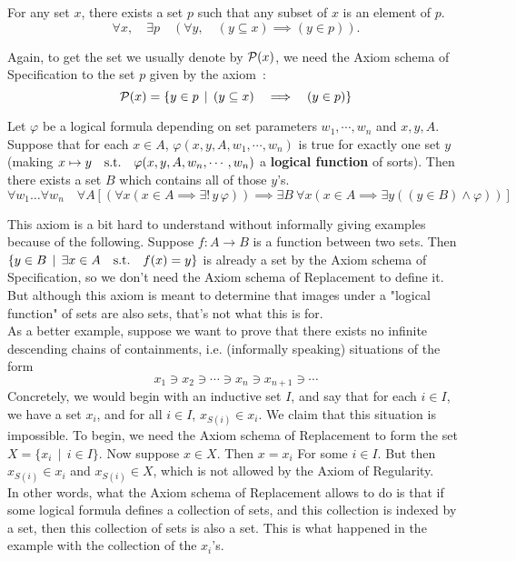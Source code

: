 \begin{axiom}
    For any set $x$, there exists a set $p$ such that any subset of $x$ is an element of $p$.
    \[
        \forall x, \quad \exists p \quad (\forall y, \quad (y \subseteq x) \implies (y \in p)).    
    \]
\end{axiom}

\begin{remark}
    Again, to get the set we usually denote by $\operatorname{\mathcal P}(x)$, we need the Axiom schema of Specification to the set $p$ given by the axiom~:
    \[
        \operatorname{\mathcal P}(x) = \{ y \in p \, \mid \, (y \subseteq x) \quad \Longrightarrow \quad (y \in p) \}    
    \]
\end{remark}

\begin{axiom}
    Let $\varphi$ be a logical formula depending on set parameters $w_1,\cdots,w_n$ and $x,y,A$. Suppose that for each $x \in A$, $\varphi(x,y,A,w_1,\cdots,w_n)$ is true for exactly one set $y$ (making $x \mapsto y \quad \text{s.t.} \quad \varphi(x,y,A,w_n,\cdots,w_n)$ a \textbf{logical function} of sorts). Then there exists a set $B$ which contains all of those $y$'s. 
    \[
        \forall w_1 \ldots \forall w_n \quad \forall A \left[ (\forall x( x \in A \implies \exists ! \, y \, \varphi)) \implies \exists B\ \forall x \left( x \in A \implies \exists y( (y \in B) \land \varphi )  \right) \right]
    \]
\end{axiom}

\begin{remark}
    This axiom is a bit hard to understand without informally giving examples because of the following. Suppose $f : A \to B$ is a function between two sets. Then $\{ y \in B \, \mid \, \exists x \in A \quad \text{s.t.} \quad f(x) = y \}$ is already a set by the Axiom schema of Specification, so we don't need the Axiom schema of Replacement to define it. But although this axiom is meant to determine that images under a "logical function" of sets are also sets, that's not what this is for. 
    \\

    As a better example, suppose we want to prove that there exists no infinite descending chains of containments, i.e. (informally speaking) situations of the form
    \[
        x_1 \ni x_2 \ni \cdots \ni x_n \ni x_{n+1} \ni \cdots    
    \]
    Concretely, we would begin with an inductive set $I$, and say that for each $i \in I$, we have a set $x_i$, and for all $i \in I$, $x_{S(i)} \in x_i$. We claim that this situation is impossible. To begin, we need the Axiom schema of Replacement to form the set $X = \{ x_i \, \mid \, i \in I \}$. Now suppose $x \in X$. Then $x = x_i$ For some $i \in I$. But then $x_{S(i)} \in x_i$ and $x_{S(i)} \in X$, which is not allowed by the Axiom of Regularity. 
    \\

    In other words, what the Axiom schema of Replacement allows to do is that if some logical formula defines a collection of sets, and this collection is indexed by a set, then this collection of sets is also a set. This is what happened in the example with the collection of the $x_i$'s. 
\end{remark}